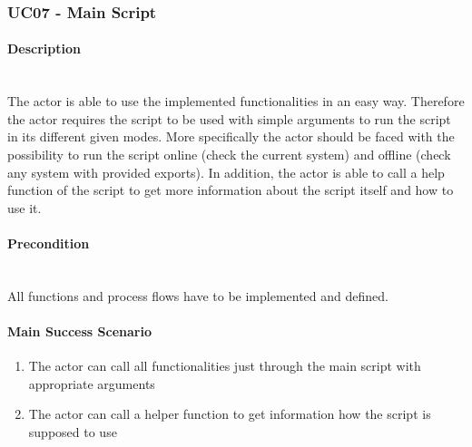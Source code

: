 \subsubsection{UC07 - Main Script}\label{UC07}
\begin{tcolorbox}
    \paragraph{Description} \ \\
    The actor is able to use the implemented functionalities in an easy way. Therefore the actor requires the script to be used with simple arguments to run the script in its different given modes. More specifically the actor should be faced with the possibility to run the script online (check the current system) and offline (check any system with provided exports). In addition, the actor is able to call a help function of the script to get more information about the script itself and how to use it.
    \ \\
    \paragraph{Precondition} \ \\
    All functions and process flows have to be implemented and defined.
    \ \\
    \paragraph{Main Success Scenario} 
    \begin{enumerate}
        \item The actor can call all functionalities just through the main script with appropriate arguments
        \item The actor can call a helper function to get information how the script is supposed to use
    \end{enumerate}   
\end{tcolorbox}



